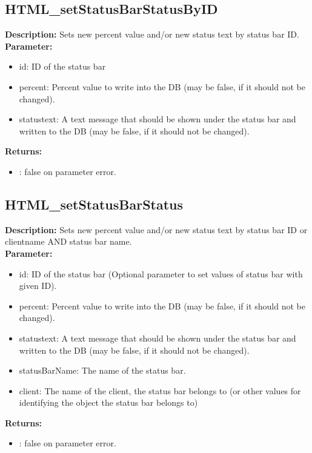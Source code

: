 \subsection{HTML\_setStatusBarStatusByID}
\textbf{Description:} Sets new percent value and/or new status text by status bar ID.\\
\textbf{Parameter:}
\begin{itemize}
\item id: ID of the status bar
\item percent: Percent value to write into the DB (may be false, if it should not be changed).
\item statustext: A text message that should be shown under the status bar and written to the DB (may be false, if it should not be changed).
\end{itemize}
\textbf{Returns:}
\begin{itemize}
\item : false on parameter error.
\end{itemize}

\subsection{HTML\_setStatusBarStatus}
\textbf{Description:} Sets new percent value and/or new status text by status bar ID or clientname AND status bar name.\\
\textbf{Parameter:}
\begin{itemize}
\item id: ID of the status bar (Optional parameter to set values of status bar with given ID).
\item percent: Percent value to write into the DB (may be false, if it should not be changed).
\item statustext: A text message that should be shown under the status bar and written to the DB (may be false, if it should not be changed).
\item statusBarName: The name of the status bar.
\item client: The name of the client, the status bar belongs to (or other values for identifying the object the status bar belongs to)
\end{itemize}
\textbf{Returns:}
\begin{itemize}
\item : false on parameter error.
\end{itemize}


